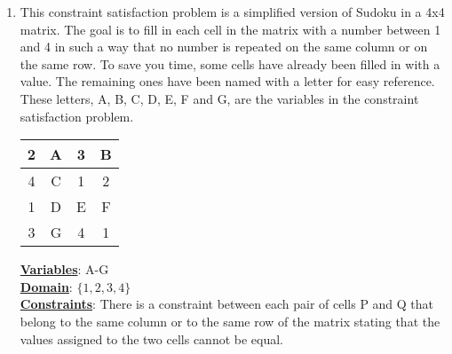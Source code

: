 \documentclass[10pt]{article}
\begin{document}
\begin{enumerate}
\item This constraint satisfaction problem is a simplified version of Sudoku in a 4x4 matrix.
The goal is to fill in each cell in the matrix with a number between 1 and 4 in such a way
that no number is repeated on the same column or on the same row. To save you time,
some cells have already been filled in with a value. The remaining ones have been named
with a letter for easy reference. These letters, A, B, C, D, E, F and G, are the variables in
the constraint satisfaction problem.
\begin{center}
  \begin{tabular}{|c|c|c|c|}
    \hline
    2 & A & 3 & B \\
    \hline
    4 & C & 1 & 2 \\
    \hline
    1 & D & E & F \\
    \hline
    3 & G & 4 & 1 \\
    \hline
  \end{tabular}  
\end{center}
\textbf{\underline{Variables}}: A-G \\
\textbf{\underline{Domain}}: $\{1,2,3,4\}$ \\
\textbf{\underline{Constraints}}: There is a constraint between each pair of cells P and Q that belong to the same column or to the same row of the matrix stating that the values assigned to the two
cells cannot be equal. \\



\end{enumerate}
\end{document}
